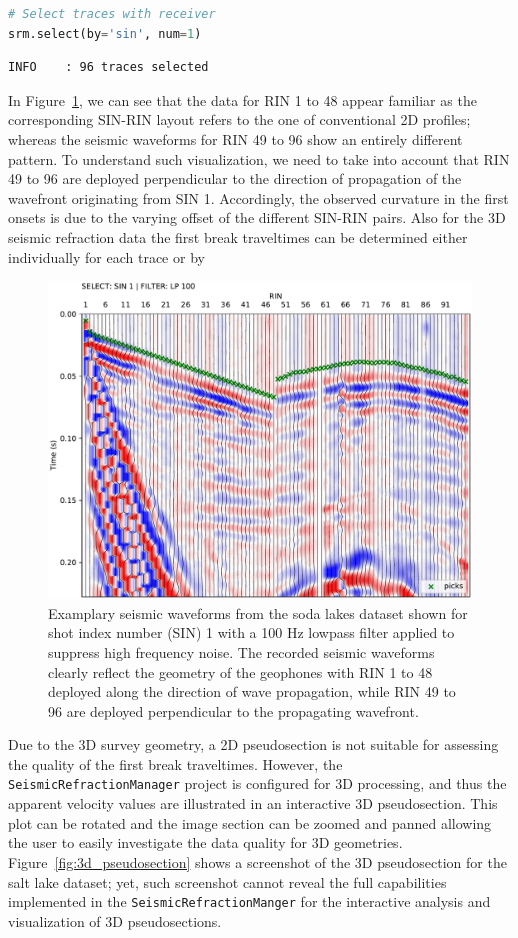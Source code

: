 \documentclass[a4paper,fleqn]{cas-sc}
\begin{document}
\begin{lstlisting}[language=Python, firstnumber=10]
# Select traces with receiver
srm.select(by='sin', num=1)
\end{lstlisting}
\begin{footnotesize}
\begin{verbatim}
INFO    : 96 traces selected
\end{verbatim}
\end{footnotesize}
In Figure~\ref{fig:3d_pickwindow}, we can see that the data for RIN 1 to 48 appear familiar as the corresponding SIN-RIN layout refers to the one of conventional 2D profiles; whereas the seismic waveforms for RIN 49 to 96 show an entirely different pattern. To understand such visualization, we need to take into account that RIN 49 to 96 are deployed perpendicular to the direction of propagation of the wavefront originating from SIN 1. Accordingly, the observed curvature in the first onsets is due to the varying offset of the different SIN-RIN pairs. Also for the 3D seismic refraction data the first break traveltimes can be determined either individually for each trace or by 
\begin{figure}
	\centering
	\includegraphics[width=.75\textwidth]{figures/sodalakes_sin1_lp100_picks_vd.pdf}
	\caption{Examplary seismic waveforms from the soda lakes dataset shown for shot index number (SIN) 1 with a 100 Hz lowpass filter applied to suppress high frequency noise. The recorded seismic waveforms clearly reflect the geometry of the geophones with RIN 1 to 48 deployed along the direction of wave propagation, while RIN 49 to 96 are deployed perpendicular to the propagating wavefront.}
	\label{fig:3d_pickwindow}
\end{figure}

Due to the 3D survey geometry, a 2D pseudosection is not suitable for assessing the quality of the first break traveltimes. However, the \texttt{SeismicRefractionManager} project is configured for 3D processing, and thus the apparent velocity values are illustrated in an interactive 3D pseudosection. This plot can be rotated and the image section can be zoomed and panned allowing the user to easily investigate the data quality for 3D geometries. Figure~\ref{fig:3d_pseudosection} shows a screenshot of the 3D pseudosection for the salt lake dataset; yet, such screenshot cannot reveal the full capabilities implemented in the \texttt{SeismicRefractionManger} for the interactive analysis and visualization of 3D pseudosections.
\end{document}
